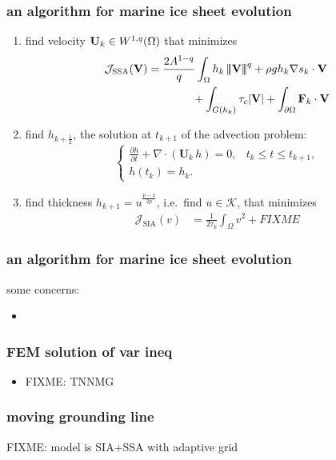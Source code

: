 \documentclass{beamer}
\newcommand{\Div}{\nabla\cdot}
\newcommand{\grad}{\nabla}
\begin{document}
\begin{frame}
  \frametitle{an algorithm for marine ice sheet evolution}


\begin{enumerate}
\small
\item find velocity $\mathbf{U}_k \in W^{1,q}(\Omega)$ that minimizes
\begin{align*}
\mathcal{J}_{\text{SSA}}(\mathbf{V}) &= \frac{2 A^{1-q}}{q} \int_\Omega h_k \Tnorm{\mathbf{V}}^q + \rho g h_k \grad s_k \cdot \mathbf{V} \\
  &\qquad\qquad + \int_{G(h_k)} \tau_c |\mathbf{V}| + \int_{\partial\Omega} \mathbf{F}_k \cdot \mathbf{V}
\end{align*}
\item find $h_{k+\frac12}$, the solution at $t_{k+1}$ of the advection problem:
$$\begin{cases}
  \frac{\partial h}{\partial t} + \Div \left(\mathbf{U}_k\, h\right) = 0, & t_k \le t \le t_{k+1}, \\
  h(t_k) = h_k. &
\end{cases}$$
\item find thickness $h_{k+1} = u^{\frac{p-1}{2p}}$, i.e.~find $u\in\mathcal{K}$, that minimizes  %
\begin{align*}
\mathcal{J}_{\text{SIA}}(v) &= \frac{1}{2 \tau_k} \int_\Omega v^2 + FIXME
\end{align*}
\end{enumerate}
\end{frame}


\begin{frame}
  \frametitle{an algorithm for marine ice sheet evolution}

some concerns:
\begin{itemize}
\item 
\end{itemize}
\end{frame}


\begin{frame}
  \frametitle{FEM solution of var ineq}

\begin{itemize}
\item FIXME: TNNMG
\end{itemize}
\end{frame}


\begin{frame}
  \frametitle{moving grounding line}

FIXME: model is SIA+SSA with adaptive grid

\begin{center}
\end{center}
\end{frame}
\end{document}
